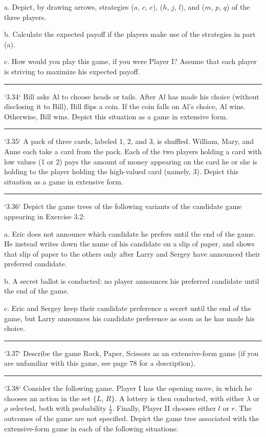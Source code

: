 \documentclass[10pt]{report}
\begin{document}
a. Depict, by drawing arrows, strategies ($a$, $c$, $e$), ($h$, $j$, $l$), and ($m$, $p$, $q$) of the three players.

b. Calculate the expected payoff if the players make use of the strategies in part (a).

c. How would you play this game, if you were Player I? Assume that each player is striving to maximize his expected payoff.

\vspace{0.5cm}
\hrule
\vspace{0.5cm}
`3.34` Bill asks Al to choose heads or tails. After Al has made his choice (without disclosing it to Bill), Bill flips a coin. If the coin falls on Al's choice, Al wins. Otherwise, Bill wins. Depict this situation as a game in extensive form.

\vspace{0.5cm}
\hrule
\vspace{0.5cm}
`3.35` A pack of three cards, labeled 1, 2, and 3, is shuffled. William, Mary, and Anne each take a card from the pack. Each of the two players holding a card with low values (1 or 2) pays the amount of money appearing on the card he or she is holding to the player holding the high-valued card (namely, 3). Depict this situation as a game in extensive form.

\vspace{0.5cm}
\hrule
\vspace{0.5cm}
`3.36` Depict the game trees of the following variants of the candidate game appearing in Exercise 3.2:

a. Eric does not announce which candidate he prefers until the end of the game. He instead writes down the name of his candidate on a slip of paper, and shows that slip of paper to the others only after Larry and Sergey have announced their preferred candidate.

b. A secret ballot is conducted: no player announces his preferred candidate until the end of the game.

c. Eric and Sergey keep their candidate preference a secret until the end of the game, but Larry announces his candidate preference as soon as he has made his choice.


\vspace{0.5cm}
\hrule
\vspace{0.5cm}
`3.37` Describe the game Rock, Paper, Scissors as an extensive-form game (if you are unfamiliar with this game, see page $78$ for a description).

\vspace{0.5cm}
\hrule
\vspace{0.5cm}
`3.38` Consider the following game. Player I has the opening move, in which he chooses an action in the set $\{L$, $R\}$. A lottery is then conducted, with either $\lambda$ or $\rho$ selected, both with probability $\frac{1}{2}$. Finally, Player II chooses either $l$ or $r$. The outcomes of the game are not specified. Depict the game tree associated with the extensive-form game in each of the following situations:
\end{document}
